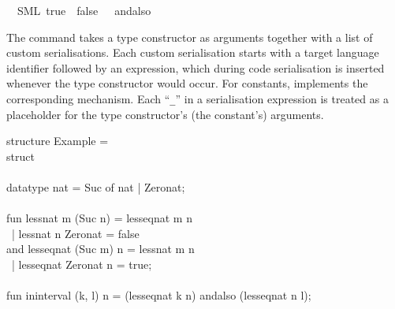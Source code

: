 \begin{isabellebody}
\ \ {\isacharparenleft}SML\ {\isachardoublequoteopen}true{\isachardoublequoteclose}\ \ {\isachardoublequoteopen}false{\isachardoublequoteclose}\ \ {\isachardoublequoteopen}{\isacharunderscore}\ andalso\ {\isacharunderscore}{\isachardoublequoteclose}{\isacharparenright}%
\endisatagquotett
{\isafoldquotett}%
%
\isadelimquotett
%
\endisadelimquotett
%
\begin{isamarkuptext}%
\noindent The \hyperlink{command.code-type}{\mbox{}} command takes a type constructor
  as arguments together with a list of custom serialisations.
  Each custom serialisation starts with a target language
  identifier followed by an expression, which during
  code serialisation is inserted whenever the type constructor
  would occur.  For constants, \hyperlink{command.code-const}{\mbox{}} implements
  the corresponding mechanism.  Each ``\verb|_|'' in
  a serialisation expression is treated as a placeholder
  for the type constructor's (the constant's) arguments.%
\end{isamarkuptext}%
\isamarkuptrue%
%
\isadelimquote
%
\endisadelimquote
%
\isatagquote
%
\begin{isamarkuptext}%
\isatypewriter%
\noindent%
\hspace*{0pt}structure Example = \\
\hspace*{0pt}struct\\
\hspace*{0pt}\\
\hspace*{0pt}datatype nat = Suc of nat | Zero{}nat;\\
\hspace*{0pt}\\
\hspace*{0pt}fun less{}nat m (Suc n) = less{}eq{}nat m n\\
\hspace*{0pt} ~| less{}nat n Zero{}nat = false\\
\hspace*{0pt}and less{}eq{}nat (Suc m) n = less{}nat m n\\
\hspace*{0pt} ~| less{}eq{}nat Zero{}nat n = true;\\
\hspace*{0pt}\\
\hspace*{0pt}fun in{}interval (k, l) n = (less{}eq{}nat k n) andalso (less{}eq{}nat n l);\\

\end{isamarkuptext}
\end{isabellebody}
